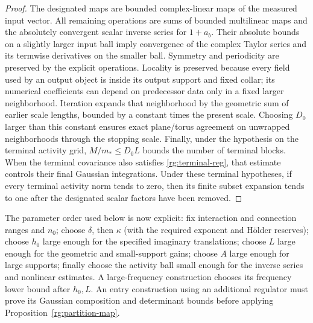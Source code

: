 \begin{proof}
The designated maps are bounded complex-linear maps of the measured input vector.  All remaining operations are sums of bounded multilinear maps and the absolutely convergent scalar inverse series for $1+a_b$.  Their absolute bounds on a slightly larger input ball imply convergence of the complex Taylor series and its termwise derivatives on the smaller ball.  Symmetry and periodicity are preserved by the explicit operations.  Locality is preserved because every field used by an output object is inside its output support and fixed collar; its numerical coefficients can depend on predecessor data only in a fixed larger neighborhood.  Iteration expands that neighborhood by the geometric sum of earlier scale lengths, bounded by a constant times the present scale.  Choosing $D_0$ larger than this constant ensures exact plane/torus agreement on unwrapped neighborhoods through the stopping scale.  Finally, under the hypothesis on the terminal activity grid, $M/m_*\le D_0L$ bounds the number of terminal blocks.  When the terminal covariance also satisfies \eqref{rg:terminal-reg}, that estimate controls their final Gaussian integrations.  Under these terminal hypotheses, if every terminal activity norm tends to zero, then its finite subset expansion tends to one after the designated scalar factors have been removed.
\end{proof}

The parameter order used below is now explicit: fix interaction and connection ranges and $n_0$; choose $\delta$, then $\kappa$ (with the required exponent and H\"older reserves); choose $h_0$ large enough for the specified imaginary translations; choose $L$ large enough for the geometric and small-support gains; choose $A$ large enough for large supports; finally choose the activity ball small enough for the inverse series and nonlinear estimates.  A large-frequency construction chooses its frequency lower bound after $h_0,L$.  An entry construction using an additional regulator must prove its Gaussian composition and determinant bounds before applying Proposition~\ref{rg:partition-map}.
